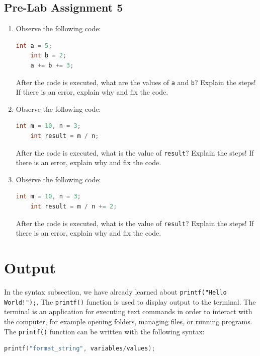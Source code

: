 \subsection*{Pre-Lab Assignment 5}
\begin{enumerate}
    \item Observe the following code:
    \begin{lstlisting}[language=c]
	int a = 5;
	int b = 2;
	a += b += 3;
\end{lstlisting}
    After the code is executed, what are the values of \texttt{a} and \texttt{b}?  
    Explain the steps! If there is an error, explain why and fix the code.

    \item Observe the following code:
    \begin{lstlisting}[language=c]
	int m = 10, n = 3;
	int result = m / n;
\end{lstlisting}
    After the code is executed, what is the value of \texttt{result}?  
    Explain the steps! If there is an error, explain why and fix the code.

    \item Observe the following code:
    \begin{lstlisting}[language=c]
	int m = 10, n = 3;
	int result = m / n += 2;
\end{lstlisting}
    After the code is executed, what is the value of \texttt{result}?  
    Explain the steps! If there is an error, explain why and fix the code.
\end{enumerate}

\section{Output}

In the syntax subsection, we have already learned about \verb|printf("Hello World!");|.  
The \verb|printf()| function is used to display output to the terminal.  
The terminal is an application for executing text commands in order to interact with the computer, for example opening folders, managing files, or running programs.  
The \verb|printf()| function can be written with the following syntax:

{
\captionsetup[lstlisting]{labelformat=empty, justification=raggedright, singlelinecheck=false} %
\begin{lstlisting}[language=c, caption={Syntax}]
    printf("format_string", variables/values);
\end{lstlisting}
}

